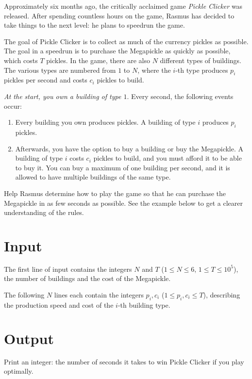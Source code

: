 \noindent

Approximately six months ago, the critically acclaimed game \emph{Pickle Clicker} was released.
After spending countless hours on the game, Rasmus has decided to take things to the
next level: he plans to speedrun the game.

The goal of Pickle Clicker is to collect as much of the currency pickles as possible. The
goal in a speedrun is to purchase the Megapickle as quickly as possible, which costs
$T$ pickles. In the game, there are also $N$ different types of buildings. The various
types are numbered from $1$ to $N$, where the $i$-th type produces $p_i$ pickles per
second and costs $c_i$ pickles to build.

\textit{At the start, you own a building of type $1$}. Every second, the following events occur:

\begin{enumerate}
  \item Every building you own produces pickles. A building of type $i$ produces $p_i$ pickles.
  \item Afterwards, you have the option to buy a building or buy the Megapickle. A building
  of type $i$ costs $c_i$ pickles to build, and you must afford it to be able to buy it.
  You can buy a maximum of one building per second, and it is allowed to have multiple
  buildings of the same type.
\end{enumerate}

Help Rasmus determine how to play the game so that he can purchase the Megapickle in as
few seconds as possible. See the example below to get a clearer understanding of the rules.

\section*{Input}
The first line of input contains the integers $N$ and $T$ ($1 \le N \le 6$, $1 \leq T \leq 10^5$),
the number of buildings and the cost of the Megapickle.

The following $N$ lines each contain the integers $p_i, c_i$ ($1 \leq p_i, c_i \leq T$),
describing the production speed and cost of the $i$-th building type.

\section*{Output}
Print an integer: the number of seconds it takes to win Pickle Clicker if you play optimally.


